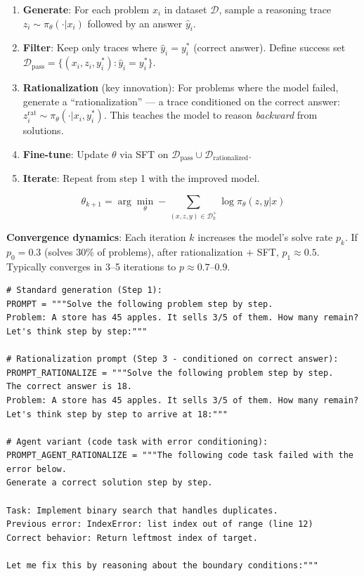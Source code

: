 \begin{enumerate}
  \item \textbf{Generate}: For each problem $x_i$ in dataset $\mathcal{D}$, sample a reasoning trace $z_i \sim \pi_\theta(\cdot | x_i)$ followed by an answer $\hat{y}_i$.
  \item \textbf{Filter}: Keep only traces where $\hat{y}_i = y_i^*$ (correct answer). Define success set $\mathcal{D}_{\text{pass}} = \{(x_i, z_i, y_i^*) : \hat{y}_i = y_i^*\}$.
  \item \textbf{Rationalization} (key innovation): For problems where the model failed, generate a ``rationalization'' --- a trace conditioned on the correct answer: $z_i^{\text{rat}} \sim \pi_\theta(\cdot | x_i, y_i^*)$. This teaches the model to reason \emph{backward} from solutions.
  \item \textbf{Fine-tune}: Update $\theta$ via SFT on $\mathcal{D}_{\text{pass}} \cup \mathcal{D}_{\text{rationalized}}$.
  \item \textbf{Iterate}: Repeat from step 1 with the improved model.
\end{enumerate}

\begin{equation}
\boxed{\theta_{k+1} = \arg\min_\theta -\sum_{(x,z,y) \in \mathcal{D}_k^+} \log \pi_\theta(z, y | x)}
\end{equation}

\textbf{Convergence dynamics}: Each iteration $k$ increases the model’s solve rate $p_k$. If $p_0 = 0.3$ (solves 30\% of problems), after rationalization + SFT, $p_1 \approx 0.5$. Typically converges in 3--5 iterations to $p \approx 0.7$--$0.9$.

\begin{examplebox}
\begin{lstlisting}[style=pythonstyle]
# Standard generation (Step 1):
PROMPT = """Solve the following problem step by step.
Problem: A store has 45 apples. It sells 3/5 of them. How many remain?
Let's think step by step:"""

# Rationalization prompt (Step 3 - conditioned on correct answer):
PROMPT_RATIONALIZE = """Solve the following problem step by step.
The correct answer is 18.
Problem: A store has 45 apples. It sells 3/5 of them. How many remain?
Let's think step by step to arrive at 18:"""

# Agent variant (code task with error conditioning):
PROMPT_AGENT_RATIONALIZE = """The following code task failed with the error below.
Generate a correct solution step by step.

Task: Implement binary search that handles duplicates.
Previous error: IndexError: list index out of range (line 12)
Correct behavior: Return leftmost index of target.

Let me fix this by reasoning about the boundary conditions:"""
\end{lstlisting}
\end{examplebox}

